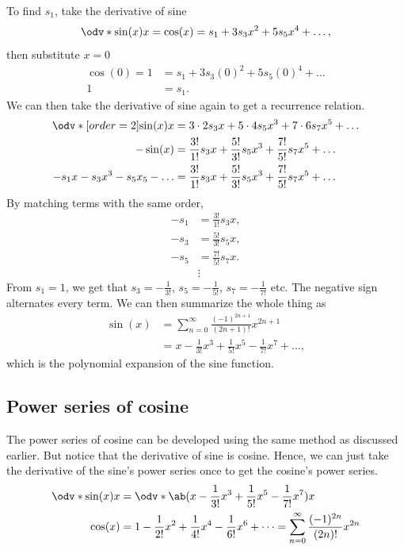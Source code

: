 To find $s_1$, take the derivative of sine
\begin{equation}
	\odv*{\sin(x)}{x} = \cos(x) = s_1 + 3s_3x^2 + 5s_5x^4 + \dots,
\end{equation}
then substitute $x = 0$
\begin{align}
	\cos(0) = 1 & = s_1 + 3s_3(0)^2 + 5s_5(0)^4 + \dots \\
	1           & = s_1.
\end{align}
We can then take the derivative of sine again to get a recurrence relation.
\begin{align}
	\odv*[order = 2]{\sin(x)}{x}    & = 3\cdot 2s_3x + 5\cdot 4s_5x^3 + 7\cdot 6s_7x^5 + \dots                \\
	-\sin(x)                        & = \frac{3!}{1!}s_3x + \frac{5!}{3!}s_5x^3 + \frac{7!}{5!}s_7x^5 + \dots \\
	-s_1x - s_3x^3 - s_5x_5 - \dots & = \frac{3!}{1!}s_3x + \frac{5!}{3!}s_5x^3 + \frac{7!}{5!}s_7x^5 + \dots
\end{align}
By matching terms with the same order,
\begin{equation}
	\begin{aligned}
		-s_1 & = \frac{3!}{1!}s_3x, \\
		-s_3 & = \frac{5!}{3!}s_5x, \\
		-s_5 & = \frac{7!}{5!}s_7x. \\
		     & \vdots
	\end{aligned}
\end{equation}
From $s_1 = 1$, we get that $s_3 = -\frac{1}{3!}$, $s_5 = -\frac{1}{5!}$, $s_7 = -\frac{1}{7!}$ etc. The negative sign alternates every term. We can then summarize the whole thing as
\begin{align}
	\sin(x) & = \sum_{n = 0}^{\infty}\frac{(-1)^{2n + 1}}{(2n + 1)!}x^{2n + 1}                                \\
	        & = x - \frac{1}{3!}x^3 + \frac{1}{5!}x^5 - \frac{1}{7!}x^7 + \dots, \label{eq:sine-power-series}
\end{align}
which is the polynomial expansion of the sine function.

\subsection{Power series of cosine}

The power series of cosine can be developed using the same method as discussed earlier. But notice that the derivative of sine is cosine. Hence, we can just take the derivative of the sine's power series once to get the cosine's power series.
\begin{align}
	\odv*{\sin(x)}{x} & = \odv*{\ab(x - \frac{1}{3!}x^3 + \frac{1}{5!}x^5 - \frac{1}{7!}x^7)}{x}                                                                             \\
	\cos(x)           & = 1 - \frac{1}{2!}x^2 + \frac{1}{4!}x^4 - \frac{1}{6!}x^6 + \dots = \sum_{n = 0}^{\infty}\frac{(-1)^{2n}}{(2n)!}x^{2n}\label{eq:cosine-power-series}
\end{align}

